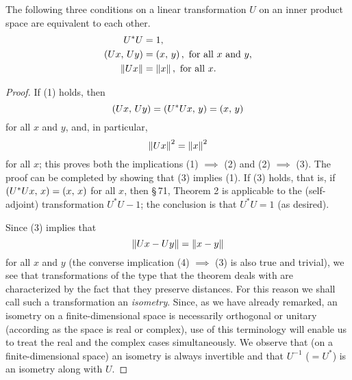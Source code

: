 \begin{thmx}
    The following three conditions on a linear transformation \(U\) on an inner product space are equivalent to each other.
    \begin{align}
        U^* U &= 1,\\
        \left(Ux,\,Uy\right) &= \left(x,\,y\right), \text{ for all } x \text{ and } y, \\
        \left\lVert Ux\right\rVert &= \left\lVert x\right\rVert, \text{ for all } x.
    \end{align}
\end{thmx}
\begin{proof}
    If (1) holds, then
    \begin{equation*}
        \left(Ux,\,Uy\right) = \left(U^* Ux,\,y\right) = \left(x,\,y\right)
    \end{equation*}
    for all \(x\) and \(y\), and, in particular,
    \begin{equation*}
        \left\lVert Ux\right\rVert^2 = \left\lVert x\right\rVert^2
    \end{equation*}
    for all \(x\); this proves both the implications (1) \(\implies\) (2) and
    (2) \(\implies\) (3). The proof can be completed by showing that (3) implies
    (1). If (3) holds, that is, if \(\left(U^*Ux,\,x\right) = \left(x,\,x\right)\)
    for all \(x\), then \S\,71, Theorem 2 is applicable to the (self-adjoint)
    transformation \(U^*U-1\); the conclusion is that \(U^*U = 1\) (as desired).

    Since (3) implies that 
    \begin{equation}
        \left\lVert Ux - Uy\right\rVert = \left\lVert x - y\right\rVert
    \end{equation}
    for all \(x\) and \(y\) (the converse implication (4) \(\implies\) (3) is
    also true and trivial), we see that transformations of the type that the
    theorem deals with are characterized by the fact that they preserve
    distances. For this reason we shall call such a transformation an
    \emph{isometry}. Since, as we have already remarked, an isometry on a
    finite-dimensional space is necessarily orthogonal or unitary (according as
    the space is real or complex), use of this terminology will enable us to
    treat the real and the complex cases simultaneously. We observe that (on a
    finite-dimensional space) an isometry is always invertible and that
    \(U^{-1}\) (\(= U^*\)) is an isometry along with \(U\).
\end{proof}

